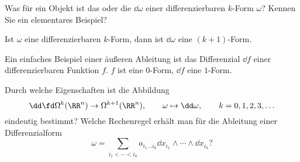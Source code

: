 \begin{frage}
  Was für ein Objekt ist das  oder die 
   $\dd \omega$ einer 
  differenzierbaren $k$-Form $\omega$? 
  Kennen Sie ein elementares Beispiel?  
\end{frage} 

\begin{antwort}
  Ist $\omega$ eine differenzierbaren $k$-Form, dann 
  ist $\dd \omega$ eine $(k+1)$-Form. 

  Ein einfaches Beispiel einer äußeren Ableitung ist das 
  Differenzial $\dd f$ einer differenzierbaren Funktion $f$. 
  $f$ ist eine $0$-Form, $\dd f$ eine $1$-Form.
  \AntEnd 
\end{antwort} 

\begin{frage}
  Durch welche Eigenschaften ist die Abbildung 
  \[
  \dd \fd \Omega^k(\RR^n) \to \Omega^{k+1}(\RR^n), \qquad 
  \omega \mapsto \dd \omega, \qquad k=0,1,2,3,\ldots
  \]
  eindeutig bestimmt? Welche Rechenregel 
  erhält man für die Ableitung einer Differenzialform 
  \[
  \omega = 
  \sum_{i_1 <\cdots< i_k} a_{i_1\ldots i_k} \dd x_{i_1} \wedge 
  \cdots \wedge \dd x_{i_k}
  \text{?}
  \]
\end{frage}


